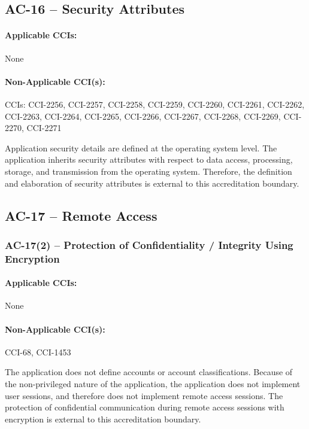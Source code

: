 \documentclass[letterpaper, 10pt, twoside]{article}
\begin{document}
\subsection{AC-16 -- Security Attributes}

\paragraph{Applicable CCIs:} None

\paragraph{Non-Applicable CCI(s):} CCIs: CCI-2256, CCI-2257, CCI-2258, CCI-2259, CCI-2260, CCI-2261, CCI-2262, CCI-2263, CCI-2264, CCI-2265, CCI-2266, CCI-2267, CCI-2268, CCI-2269, CCI-2270, CCI-2271

Application security details are defined at the operating system level. The application inherits security attributes with respect to data access, processing, storage, and transmission from the operating system. Therefore, the definition and elaboration of security attributes is external to this accreditation boundary.

\subsection{AC-17 -- Remote Access}

\subsubsection{AC-17(2) -- Protection of Confidentiality / Integrity Using Encryption}

\paragraph{Applicable CCIs:} None

\paragraph{Non-Applicable CCI(s):} CCI-68, CCI-1453

The application does not define accounts or account classifications. Because of the non-privileged nature of the application, the application does not implement user sessions, and therefore does not implement remote access sessions. The protection of confidential communication during remote access sessions with encryption is external to this accreditation boundary.
\end{document}
